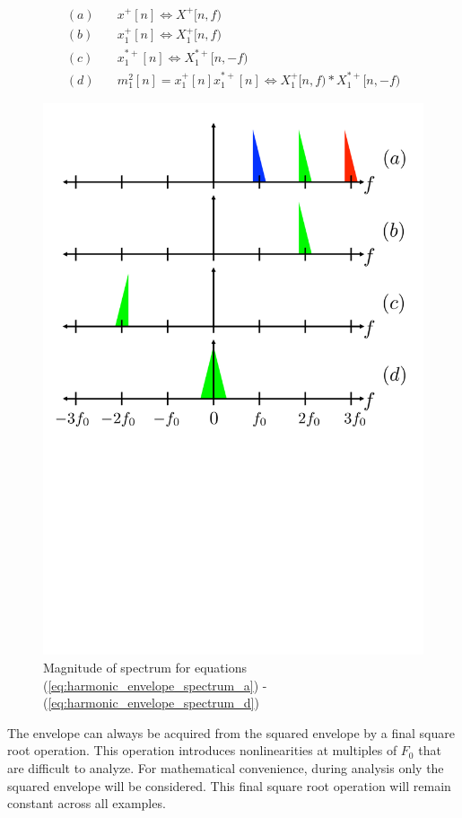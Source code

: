 \documentclass [11pt, proquest,oneside] {ganter_thesis}[2015/03/03]
\begin{document}
\begin{align}
\label{eq:harmonic_envelope_spectrum_a}
(a)& \quad x^+[n] \Longleftrightarrow X^+[n,f)  \\
(b)& \quad x^+_1[n] \Longleftrightarrow X^+_1[n,f) \\
(c)& \quad x^{*+}_1[n] \Longleftrightarrow X^{*+}_1[n,-f) \\
\label{eq:harmonic_envelope_spectrum_d}
(d)& \quad m_1^2[n] = x^+_1[n] x^{*+}_1[n] \Longleftrightarrow X^+_1[n,f) * X^{*+}_1[n,-f)
\end{align}

\begin{figure}[!ht]
  \centering
    \includegraphics[width=.62\textwidth]{harmonic_envelope}
        \caption{Magnitude of spectrum for equations (\ref{eq:harmonic_envelope_spectrum_a}) - (\ref{eq:harmonic_envelope_spectrum_d})}\label{fig:harmonic_envelope}
\end{figure}

The envelope can always be acquired from the squared envelope by a final square root operation.  This operation introduces nonlinearities at multiples of $F_0$ that are difficult to analyze.  For mathematical convenience, during analysis only the squared envelope will be considered.  This final square root operation will remain constant across all examples.
\end{document}
